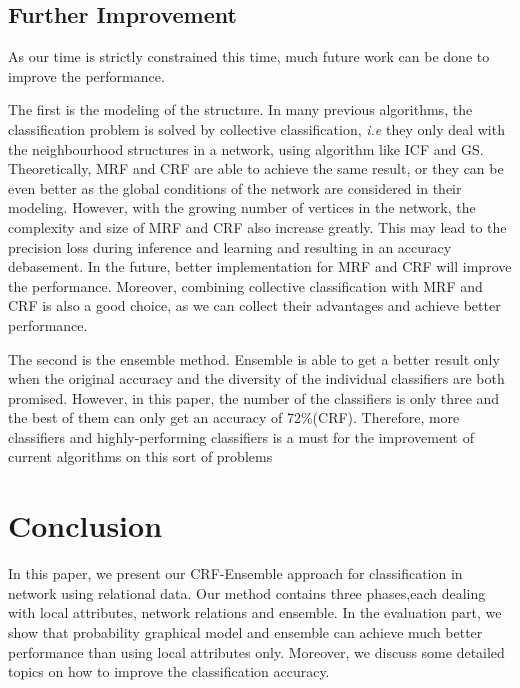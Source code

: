 \documentclass{sig-alternate}
\begin{document}
\subsection{Further Improvement}
As our time is strictly constrained this time, much future work can be done to improve the performance.

The first is the modeling of the structure. In many previous algorithms, the classification problem is solved by collective classification, \emph{i.e} they only deal with the neighbourhood structures in a network, using algorithm like ICF and GS. Theoretically, MRF and CRF are able to achieve the same result, or they can be even better as the global conditions of the network are considered in their modeling. However, with the growing number of vertices in the network, the complexity and size of MRF and CRF also increase greatly. This may lead to the precision loss during inference and learning and resulting in an accuracy debasement. In the future, better implementation for MRF and CRF will improve the performance. Moreover, combining collective classification with MRF and CRF is also a good choice, as we can collect their advantages and achieve better performance.

The second is the ensemble method. Ensemble is able to get a better result only when the original accuracy and the diversity of the individual classifiers are both promised. However, in this paper, the number of the classifiers is only three and the best of them can only get an accuracy of 72\%(CRF). Therefore, more classifiers and highly-performing classifiers is a must for the improvement of current algorithms on this sort of problems

\section{Conclusion}
In this paper, we present our CRF-Ensemble approach for classification in network using relational data. Our method contains three phases,each  dealing with local attributes, network relations and ensemble. In the evaluation part, we show that probability graphical model and ensemble can achieve much better performance than using local attributes only. Moreover, we discuss some detailed topics on how to improve the classification accuracy.
\end{document}
